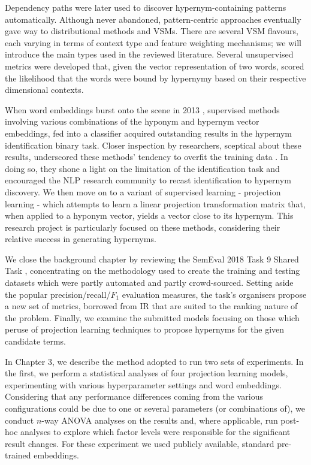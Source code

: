 Dependency paths were later used to discover hypernym-containing patterns automatically.  Although never abandoned, pattern-centric approaches eventually gave way to distributional methods and \acl{VSM}s.  There are several \ac{VSM} flavours, each varying in terms of context type and feature weighting mechanisms; we will introduce the main types used in the reviewed literature.  Several unsupervised metrics were developed that, given the vector representation of two words, scored the likelihood that the words were bound by hypernymy based on their respective dimensional contexts.

When word embeddings burst onto the scene in 2013 \citep{mikolov2013distributed}, supervised methods involving various combinations of the hyponym and hypernym vector embeddings, fed into a classifier acquired outstanding results in the hypernym identification binary task.  Closer inspection by researchers, sceptical about these results, underscored these methods’ tendency to overfit the training data \citep{levy2015supervised, santus2016nine}. In doing so, they shone a light on the limitation of the identification task and encouraged the NLP research community to recast identification to hypernym discovery.  We then move on to a variant of supervised learning - projection learning - which attempts to learn a linear projection transformation matrix that, when applied to a hyponym vector, yields a vector close to its hypernym.  This research project is particularly focused on these methods, considering their relative success in generating hypernyms.  

We close the background chapter by reviewing the SemEval 2018 Task 9 Shared Task \citep{camacho2018semeval}, concentrating on the methodology used to create the training and testing datasets which were partly automated and partly crowd-sourced.  Setting aside the popular precision/recall/\(F_1\) evaluation measures, the task’s organisers propose a new set of metrics, borrowed from \ac{IR} that are suited to the ranking nature of the problem.  Finally, we examine the submitted models focusing on those which peruse of projection learning techniques to propose hypernyms for the given candidate terms.

In Chapter 3, we describe the method adopted to run two sets of experiments.  In the first, we perform a statistical analyses of four projection learning models, experimenting with various hyperparameter settings and word embeddings.  Considering that any performance differences coming from the various configurations could be due to one or several parameters (or combinations of), we conduct $n$-way \ac{ANOVA} analyses on the results and, where applicable, run post-hoc analyses to explore which factor levels were responsible for the significant result changes.  For these experiment we used publicly available, standard pre-trained embeddings.

